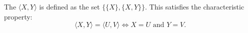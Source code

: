 The  $\langle X, Y \rangle$ is defined as the set $\{\{X\}, \{X, Y\}\}$. This satisfies the characteristic property:
$$\langle X, Y \rangle = \langle U, V \rangle \iff X = U \text{ and } Y = V.$$
